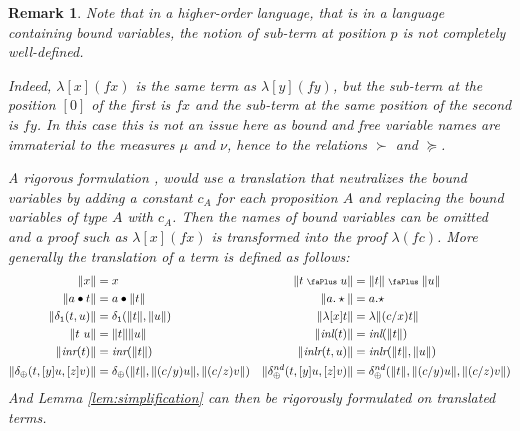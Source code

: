 \documentclass[screen, sigconf,authorversion,nonacm]{acmart}
\theoremstyle{acmdefinition}
\newtheorem{remark}[theorem]{Remark}}
\numberwithin{equation}{section}
\newcommand\abstr[1]{[#1]}
\newcommand\inl{\mbox{\it inl}}
\newcommand\inr{\mbox{\it inr}}
\newcommand\inlr{\mbox{\it inlr}}
\newcommand\plus{\mathrel{\text{\normalfont\scalebox{0.7}{\faPlus}}}}
\newcommand\one{\ensuremath{\mathtt 1}}
\newcommand\elimone{\delta_{\one}}
\newcommand\elimplus{\delta_{\oplus}}
\begin{document}
\begin{remark}
  Note that in a higher-order language, that is in a language containing
  bound variables, the notion of sub-term at position $p$ is not
  completely well-defined.

  Indeed, $\lambda \abstr{x} (f x)$ is the same term as $\lambda
  \abstr{y} (f y)$, but the sub-term at the position $[0]$ of the first
  is $f x$ and the sub-term at the same position of the second is $f
  y$.  In this case this is not an issue here as bound and free variable
  names are immaterial to the measures $\mu$ and $\nu$, hence to the
  relations $\succ$ and $\succcurlyeq$.

  A rigorous formulation \cite{IwamiToyama}, would use a translation that
  neutralizes the bound variables by adding a constant $c_A$ for each
  proposition $A$ and replacing the bound variables of type $A$ with
  $c_A$. Then the names of bound variables can be omitted and a proof
  such as $\lambda \abstr{x} (f x)$ is transformed into the proof
  $\lambda (f c)$.  More generally the translation of a term is defined
  as follows:
  \begin{align*}
    \| x \| &= x &
    \| t \plus u \| &= \| t \| \plus \| u \|\\
    \| a \bullet t \| &= a \bullet \| t \| &
    \| a.\star \| &= a . \star\\
    \| \elimone(t,u) \| &= \elimone (\| t \|, \| u \|) &
    \| \lambda \abstr{x} t \| &= \lambda \| (c/x)t \|\\
    \| t~u \| &= \| t \| \| u \| &
    \| \inl(t) \| &= \inl(\| t\|)\\
    \| \inr(t) \| &= \inr(\| t\|)&
    \| \inlr(t,u) \| &= \inlr(\| t\|,\|u\|)\\
    \| \elimplus(t,\abstr{y}u,\abstr{z}v) \| &= \elimplus(\| t \|,\| (c/y)u \|,\| (c/z)v \|)&
    \| \elimplus^{nd}(t,\abstr{y}u,\abstr{z}v) \| &= \elimplus^{nd}(\| t \|,\| (c/y)u \|,\| (c/z)v \|)
  \end{align*}
  And Lemma \ref{lem:simplification} can then be rigorously formulated on
  translated terms.
\end{remark}
\end{document}
